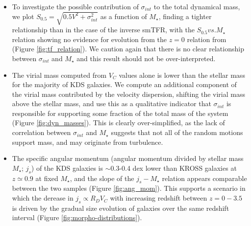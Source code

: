 \documentclass[fleqn,usenatbib]{mnras}
\begin{document}
\begin{itemize}
    \item To investigate the possible contribution of $\sigma_{int}$ to the total dynamical mass, we plot $S_{0.5} = \sqrt{0.5V^{2} + \sigma_{int}^{2}}$ as a function of $M_{\star}$, finding a tighter relationship than in the case of the inverse smTFR, with the $S_{0.5} vs. M_{\star}$ relation showing no evidence for evolution from the $z=0$ relation from \cite{Kassin2007} (Figure \ref{fig:tf_relation}).
    We caution again that there is no clear relationship between $\sigma_{int}$ and $M_{\star}$ and this result should not be over-interpreted.
    \item The virial mass computed from $V_{C}$ values alone is lower than the stellar mass for the majority of KDS galaxies.
    We compute an additional component of the virial mass contributed by the velocity dispersion, shifting the virial mass above the stellar mass, and use this as a qualitative indicator that $\sigma_{int}$ is responsible for supporting some fraction of the total mass of the system (Figure \ref{fig:dyn_masses}).
    This is clearly over-simplified, as the lack of correlation between $\sigma_{int}$ and $M_{\star}$ suggests that not all of the random motions support mass, and may originate from turbulence.
    \item The specific angular momentum (angular momentum divided by stellar mass $M_{\star}$; $j_{s}$) of the KDS galaxies is $\sim$0.3-0.4 dex lower than KROSS galaxies at $z\simeq0.9$ at fixed $M_{\star}$, and the slope of the $j_{s}-M_{\star}$ relation appears comparable between the two samples (Figure \ref{fig:ang_mom}).
    This supports a scenario in which the derease in $j_{s} \propto R_{D}V_{C}$ with increasing redshift between $z=0-3.5$ is driven by the gradual size evolution of galaxies over the same redshift interval (Figure \ref{fig:morpho-distributions}).

\end{itemize}


\clearpage 

%

\clearpage



\appendix

\bsp    %
\label{lastpage}
\end{document}
